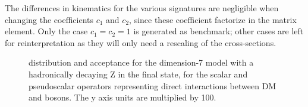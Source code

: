
The differences in kinematics for the various signatures
are negligible when changing the coefficients $c_1$ and $c_2$, 
since these coefficient factorize in the matrix element. 
Only the case $c_1=c_2=1$ is generated as benchmark;
other cases are left for reinterpretation as they will only need a 
rescaling of the cross-sections. 

\begin{figure}[h!]
  \centering
  \hfill
    \caption{\MET distribution and acceptance for the dimension-7 model with a hadronically decaying Z in the final state,
    for the scalar and pseudoscalar operators representing direct interactions between DM and bosons. The y axis units are multiplied by 100.}
    \label{fig:EFTD7_EW_kinematics}
\end{figure}


